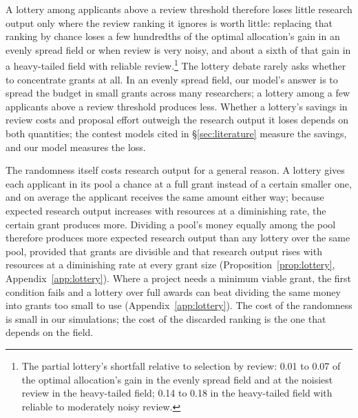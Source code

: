 \documentclass[article, 11pt, reqno]{amsart}
\theoremstyle{named}
\begin{document}


A lottery among applicants above a review threshold therefore loses little research output only where the review ranking it ignores is worth little: replacing that ranking by chance loses a few hundredths of the optimal allocation's gain in an evenly spread field or when review is very noisy, and about a sixth of that gain in a heavy-tailed field with reliable review.\footnote{The partial lottery's shortfall relative to selection by review: 0.01 to 0.07 of the optimal allocation's gain in the evenly spread field and at the noisiest review in the heavy-tailed field; 0.14 to 0.18 in the heavy-tailed field with reliable to moderately noisy review.} The lottery debate rarely asks whether to concentrate grants at all. In an evenly spread field, our model's answer is to spread the budget in small grants across many researchers; a lottery among a few applicants above a review threshold produces less. Whether a lottery's savings in review costs and proposal effort outweigh the research output it loses depends on both quantities; the contest models cited in \S\ref{sec:literature} measure the savings, and our model measures the loss.

The randomness itself costs research output for a general reason. A lottery gives each applicant in its pool a chance at a full grant instead of a certain smaller one, and on average the applicant receives the same amount either way; because expected research output increases with resources at a diminishing rate, the certain grant produces more. Dividing a pool's money equally among the pool therefore produces more expected research output than any lottery over the same pool, provided that grants are divisible and that research output rises with resources at a diminishing rate at every grant size (Proposition~\ref{prop:lottery}, Appendix~\ref{app:lottery}). Where a project needs a minimum viable grant, the first condition fails and a lottery over full awards can beat dividing the same money into grants too small to use (Appendix~\ref{app:lottery}). The cost of the randomness is small in our simulations; the cost of the discarded ranking is the one that depends on the field.
\end{document}
